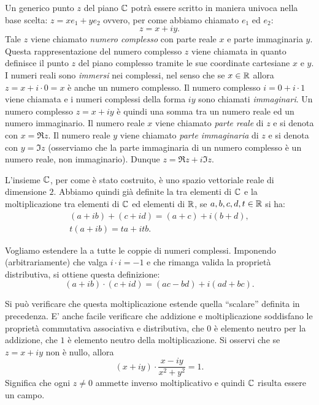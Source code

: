 Un generico punto $z$ del piano ${\mathbb C}$ potrà essere scritto in
maniera univoca nella base scelta: $z = x e_1 + y e_2$ ovvero,
per come abbiamo chiamato $e_1$ ed $e_2$:
\[
z = x + i y.
\]
Tale $z$ viene chiamato
\emph{numero complesso} con parte reale $x$ e parte immaginaria $y$.
Questa rappresentazione del numero complesso $z$ viene
chiamata  in quanto definisce
il punto $z$ del piano complesso tramite le sue coordinate cartesiane
$x$ e $y$.
I numeri reali sono \emph{immersi} nei complessi, nel senso che se
$x\in {\mathbb R}$ allora $z= x + i\cdot 0 = x$ è anche un numero complesso.
Il numero complesso $i = 0 + i\cdot 1$ viene chiamata 
e i numeri complessi della forma $iy$ sono chiamati \emph{immaginari}.
Un numero
complesso $z = x+iy$ è quindi una somma tra un numero reale ed un numero
immaginario. Il numero reale $x$ viene chiamato \emph{parte reale}
di $z$ e
si denota con $x=\Re z$.
Il numero reale $y$ viene chiamato
\emph{parte immaginaria}
di $z$ e si denota con $y=\Im z$
(osserviamo che la parte immaginaria di un numero complesso è un numero
reale, non immaginario). Dunque $z= \Re z + i \Im z$.

L'insieme ${\mathbb C}$, per come
è stato costruito, è uno spazio vettoriale reale di dimensione $2$.
Abbiamo quindi già definite la 
tra elementi di ${\mathbb C}$ e la moltiplicazione
tra elementi di ${\mathbb C}$ ed elementi di ${\mathbb R}$,
se $a,b,c,d,t\in {\mathbb R}$ si ha:
\begin{gather*}
 (a+ib) + (c+id) = (a+c) + i (b+d), \\
 t(a+ib) = ta + itb.
\end{gather*}

Vogliamo estendere la  a tutte le coppie di numeri complessi.
Imponendo (arbitrariamente) che valga $i\cdot i = -1$ e che rimanga
valida la proprietà distributiva, si ottiene
questa definizione:
\[
   (a+ib) \cdot (c+id) = (ac-bd) + i(ad+bc).
\]

Si può verificare che questa moltiplicazione estende quella ``scalare'' definita
in precedenza.
E' anche facile verificare che addizione e moltiplicazione soddisfano
le proprietà commutativa associativa e distributiva,
che $0$ è elemento neutro per la addizione, che $1$ è elemento neutro
della moltiplicazione.
Si osservi che se $z=x+iy$ non è nullo, allora
\[
  (x+iy) \cdot \frac{x-iy}{x^2+y^2} = 1.
\]
Significa che ogni $z\neq 0$ ammette inverso moltiplicativo e quindi ${\mathbb C}$
risulta essere un campo.

